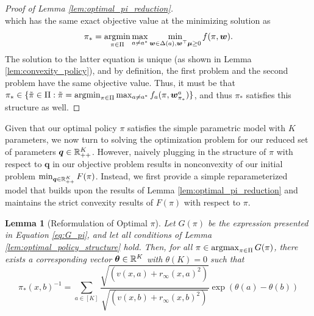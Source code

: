 \documentclass{article}
\newtheorem{lemma}{Lemma}
\begin{document}
\begin{appendices}
\begin{proof}[Proof of Lemma \ref{lem:optimal_pi_reduction}]
\begin{equation}
    \end{equation}
    which has the same exact objective value at the minimizing solution as 
    \begin{equation}
        \pi_* = \argmin_{\pi \in \Pi} \max_{a \neq a^*} \min_{\bm{w}\in \Delta(a), \bm{w}^\top \bm{\mu}\geq 0 } f(\pi, \bm{w}).
    \end{equation}
    The solution to the latter equation is unique (as shown in Lemma \ref{lem:convexity_policy}), and by definition, the first problem and the second problem have the same objective value. Thus, it must be that $\pi_* \in \{\tilde\pi \in \Pi: \tilde\pi = \argmin_{\pi \in \Pi} \max_{a\neq a^*} f_a(\pi, \bm{w}_{\pi_*}^a) \}$, and thus $\pi_*$ satisfies this structure as well. 
\end{proof}

Given that our optimal policy $\pi$ satisfies the simple parametric model with $K$ parameters, we now turn to solving the optimization problem for our reduced set of parameters $\boldsymbol{q} \in \mathbb{R}^K_{++}$. However, naively plugging in the structure of $\pi$ with respect to $\bm{q}$ in our objective problem results in nonconvexity of our initial problem $\min_{\boldsymbol{q} \in \mathbb{R}^K_{++}} F(\pi)$. Instead, we first provide a simple reparameterized model that builds upon the results of Lemma \ref{lem:optimal_pi_reduction} and maintains the strict convexity results of $F(\pi)$ with respect to $\pi$. 


\begin{lemma}[Reformulation of Optimal $\pi$]\label{lem:log_q_reformulation}
    Let $G(\pi)$ be the expression presented in Equation \eqref{eq:G_pi}, and let all conditions of Lemma \ref{lem:optimal_policy_structure} hold. Then, for all $\pi \in \argmax_{\pi \in \Pi}G(\pi)$, there exists a corresponding vector $\boldsymbol\theta \in \mathbb{R}^K$ with $\theta(K)=0$ such that 
    \begin{equation}
        \pi_*(x,b)^{-1} = \sum_{a \in [K]}\frac{ \sqrt{\left(v(x,a) + r_\infty(x,a)^2 \right)} }{\sqrt{\left(v(x,b) + r_\infty(x,b)^2 \right)} }\exp\left(\theta(a) - \theta(b)\right)
    \end{equation}
\end{lemma}


\end{appendices}
\end{document}
